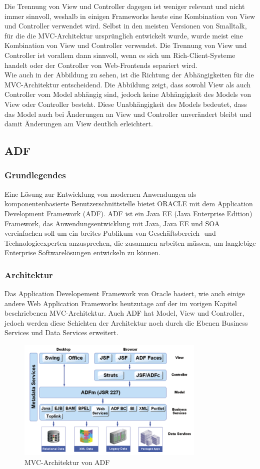 Die Trennung von View und Controller dagegen ist weniger relevant und nicht immer sinnvoll, weshalb in einigen Frameworks heute eine Kombination von View und Controller verwendet wird. Selbst in den meisten Versionen von Smalltalk, für die die MVC-Architektur ursprünglich entwickelt wurde, wurde meist eine Kombination von View und Controller verwendet. Die Trennung von View und Controller ist vorallem dann sinnvoll, wenn es sich um Rich-Client-Systeme handelt oder der Controller von Web-Frontends separiert wird. \autocite[S. 330-332]{PEAA2002}\\
Wie auch in der Abbildung zu sehen, ist die Richtung der Abhängigkeiten für die MVC-Architektur entscheidend. Die Abbildung zeigt, dass sowohl View als auch Controller vom Model abhängig sind, jedoch keine Abhängigkeit des Models von View oder Controller besteht. Diese Unabhängigkeit des Models bedeutet, dass das Model auch bei Änderungen an View und Controller unverändert bleibt und damit Änderungen am View deutlich erleichtert. \autocite[S. 330-332]{PEAA2002}
\subsection{ADF}
\subsubsection{Grundlegendes}
Eine Lösung zur Entwicklung von modernen Anwendungen als komponentenbasierte Benutzerschnittstelle bietet ORACLE mit dem Application Development Framework (ADF). ADF ist ein Java EE (Java Enterprise Edition) Framework, das Anwendungsentwicklung mit Java, Java EE und SOA vereinfachen soll um ein breites Publikum von Geschäftsbereich- und Technologieexperten anzusprechen, die zusammen arbeiten müssen, um langlebige Enterprise Softwarelösungen entwickeln zu können\autocite[S. XXIII]{OFDG2010}.
\subsubsection{Architektur}
Das Application Developement Framework von Oracle basiert, wie auch einige andere Web Application Frameworks heutzutage auf der im vorigen Kapitel beschriebenen MVC-Architektur. 
Auch ADF hat Model, View und Controller, jedoch werden diese Schichten der Architektur noch durch die Ebenen Business Services und Data Services erweitert.
\begin{figure}[H]
\centering
\includegraphics[width=0.80\textwidth]{img/MVC-ADF3.png}
\caption {MVC-Architektur von ADF}
\end{figure}

